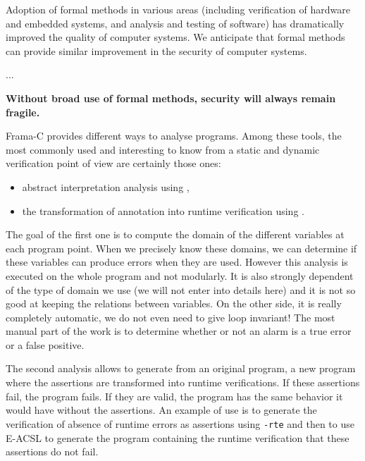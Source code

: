 \begin{Quotation}
Adoption of formal methods in various areas (including verification of hardware
and embedded systems, and analysis and testing of software) has dramatically 
improved the quality of computer systems.  We anticipate that formal methods 
can provide similar improvement in the security of computer systems.

...

\textbf{Without broad use of formal methods, security will always remain fragile.}
\end{Quotation}







Frama-C provides different ways to analyse programs. Among these tools, the
most commonly used and interesting to know from a static and dynamic
verification point of view are certainly those ones:

\begin{itemize}
\item abstract interpretation analysis using
,
\item the transformation of annotation into runtime verification using
.
\end{itemize}

The goal of the first one is to compute the domain of the different
variables at each program point. When we precisely know these domains,
we can determine if these variables can produce errors when they are
used. However this analysis is executed on the whole program and not
modularly. It is also strongly dependent of the type of domain we use (we
will not enter into details here) and it is not so good at keeping the
relations between variables. On the other side, it is really completely
automatic, we do not even need to give loop invariant! The most manual
part of the work is to determine whether or not an alarm is a true error
or a false positive.

The second analysis allows to generate from an original program, a new
program where the assertions are transformed into runtime verifications.
If these assertions fail, the program fails. If they are valid, the
program has the same behavior it would have without the assertions. An
example of use is to generate the verification of absence of runtime
errors as assertions using \texttt{-rte} and then to use E-ACSL to
generate the program containing the runtime verification that these
assertions do not fail.

